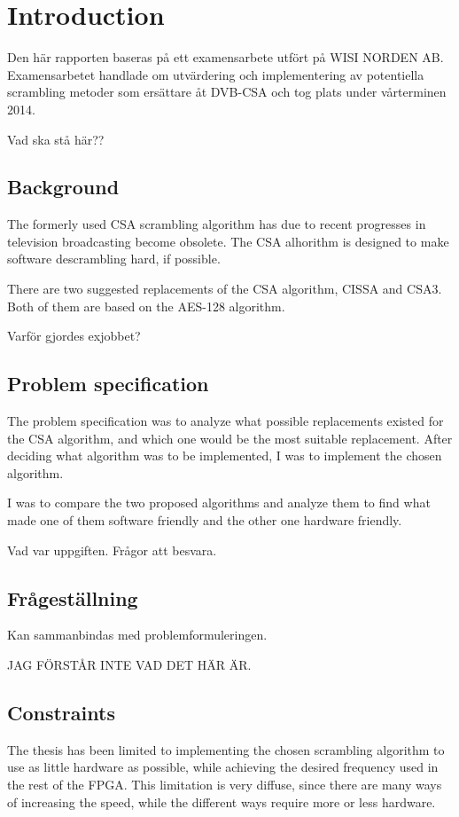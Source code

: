 \chapter{Introduction}
Den här rapporten baseras på ett examensarbete utfört på WISI NORDEN AB. 
Examensarbetet handlade om utvärdering och implementering av potentiella 
scrambling metoder som ersättare åt DVB-CSA och tog plats under vårterminen 
2014.

Vad ska stå här??

\section{Background}
The formerly used CSA scrambling algorithm has due to recent 
progresses in television broadcasting become obsolete. The CSA 
alhorithm is designed to make software descrambling hard, if possible.

There are two suggested replacements of the CSA algorithm, CISSA and 
CSA3. Both of them are based on the AES-128 algorithm. 

Varför gjordes exjobbet?


\section{Problem specification}
The problem specification was to analyze what possible replacements 
existed for the CSA algorithm, and which one would be the most suitable 
replacement. 
After deciding what algorithm was to be implemented, I was to implement 
the chosen algorithm.

I was to compare the two proposed algorithms and analyze them to find 
what made one of them software friendly and the other one hardware 
friendly.

Vad var uppgiften. Frågor att besvara.


\section{Frågeställning}
Kan sammanbindas med problemformuleringen.

JAG FÖRSTÅR INTE VAD DET HÄR ÄR.

\section{Constraints}
The thesis has been limited to implementing the chosen scrambling 
algorithm to use as little hardware as possible, while achieving 
the desired frequency used in the rest of the FPGA. This limitation 
is very diffuse, since there are many ways of increasing the speed, 
while the different ways require more or less hardware.

